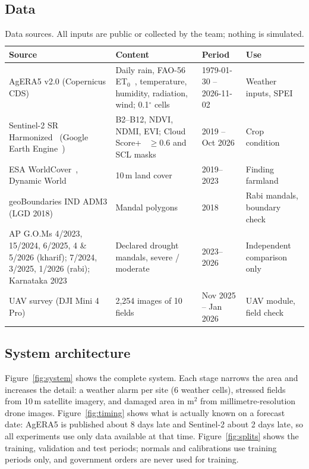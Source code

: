 \documentclass[11pt,a4paper,oneside]{article}
\begin{document}
\subsection{Data}
\begin{table}[H]
\centering
\caption{Data sources. All inputs are public or collected by the team; nothing is simulated.}
\label{tab:data}
\footnotesize
\begin{tabularx}{\textwidth}{@{}p{3.6cm}Yp{2.6cm}p{2.6cm}@{}}
\toprule
\textbf{Source} & \textbf{Content} & \textbf{Period} & \textbf{Use} \\
\midrule
AgERA5 v2.0 (Copernicus CDS)~\cite{agera5} & Daily rain, FAO-56 ET$_0$~\cite{allen1998}, temperature, humidity, radiation, wind; 0.1$^\circ$ cells & 1979-01-30 -- 2026-11-02 & Weather inputs, SPEI \\
Sentinel-2 SR Harmonized~\cite{drusch2012} (Google Earth Engine~\cite{gorelick2017}) & B2--B12, NDVI, NDMI, EVI; Cloud Score+~\cite{pasquarella2023} $\ge 0.6$ and SCL masks & 2019 -- Oct 2026 & Crop condition \\
ESA WorldCover~\cite{zanaga2022}, Dynamic World~\cite{brown2022} & 10\,m land cover & 2019--2023 & Finding farmland \\
geoBoundaries IND ADM3 (LGD 2018) & Mandal polygons & 2018 & Rabi mandals, boundary check \\
AP G.O.Ms 4/2023, 15/2024, 6/2025, 4 \& 5/2026 (kharif); 7/2024, 3/2025, 1/2026 (rabi); Karnataka 2023 & Declared drought mandals, severe / moderate & 2023--2026 & Independent comparison only \\
UAV survey (DJI Mini 4 Pro) & 2,254 images of 10 fields & Nov 2025 -- Jan 2026 & UAV module, field check \\
\bottomrule
\end{tabularx}
\end{table}

\subsection{System architecture}
Figure~\ref{fig:system} shows the complete system. Each stage narrows the area and increases the detail: a weather alarm per site (6 weather cells), stressed fields from 10\,m satellite imagery, and damaged area in m$^2$ from millimetre-resolution drone images. Figure~\ref{fig:timing} shows what is actually known on a forecast date: AgERA5 is published about 8 days late and Sentinel-2 about 2 days late, so all experiments use only data available at that time. Figure~\ref{fig:splits} shows the training, validation and test periods; normals and calibrations use training periods only, and government orders are never used for training.
\end{document}
